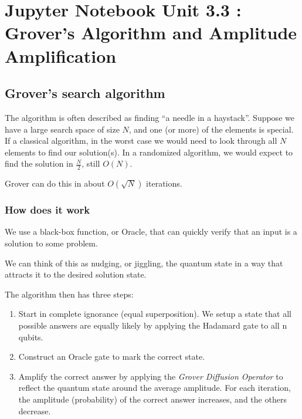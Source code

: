     \hypertarget{unit-3.3-grovers-algorithm}{%
	\section{Jupyter Notebook Unit 3.3 : Grover's Algorithm and Amplitude Amplification}\label{unit-3.3-grovers-algorithm}}

\hypertarget{grover}{%
	\subsection*{Grover's search algorithm}\label{grover}}
    

The algorithm is often described as finding ``a needle in a haystack''.
Suppose we have a large search space of size \(N\), and one (or more) of
the elements is special. If a classical algorithm, in the worst case we
would need to look through all \(N\) elements to find our solution(s).
In a randomized algorithm, we would expect to find the solution in
\(\frac{N}{2}\), still \(O(N)\).

Grover can do this in about \(O(\sqrt{N})\) iterations.

\hypertarget{how-does-it-work}{%
\subsubsection*{How does it work}\label{how-does-it-work}}

We use a black-box function, or Oracle, that can quickly verify that an
input is a solution to some problem.

We can think of this as nudging, or jiggling, the quantum state in a way
that attracts it to the desired solution state.

The algorithm then has three steps:

\begin{enumerate}
\def\labelenumi{\arabic{enumi}.}
\item
  Start in complete ignorance (equal superposition). We setup a state
  that all possible answers are equally likely by applying the Hadamard
  gate to all n qubits.
\item
  Construct an Oracle gate to mark the correct state.
\item
  Amplify the correct answer by applying the \emph{Grover Diffusion
  Operator} to reflect the quantum state around the average amplitude.
  For each iteration, the amplitude (probability) of the correct answer
  increases, and the others decrease.
\end{enumerate}

